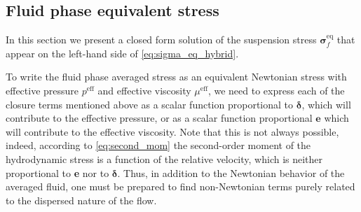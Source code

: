 \subsection{Fluid phase equivalent stress}

In this section we present a closed form solution of the suspension stress $\bm{\sigma}_f^\text{eq}$ that appear on the left-hand side of 
\ref{eq:sigma_eq_hybrid}. 

To write the fluid phase averaged stress as an equivalent Newtonian stress with effective pressure $p^\text{eff}$ and effective viscosity $\mu^\text{eff}$, we need to express each of the closure terms mentioned above as a scalar function proportional to $\bm\delta$, which will contribute to the effective pressure, or as a scalar function proportional $\textbf{e}$ which will contribute to the effective viscosity. 
Note that this is not always possible, indeed, according to \ref{eq:second_mom} the second-order moment of the hydrodynamic stress is a function of the relative velocity, which is neither proportional to \textbf{e} nor to $\bm\delta$. 
Thus, in addition to the Newtonian behavior of the averaged fluid, one must be prepared to find non-Newtonian terms purely related to the dispersed nature of the flow. 


